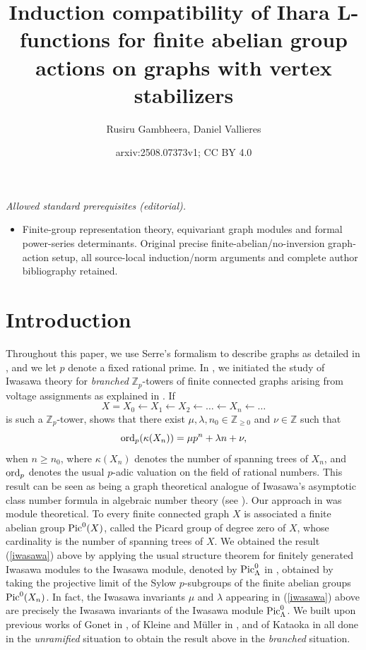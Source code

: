 \documentclass[11pt]{amsart}
\title{Induction compatibility of Ihara L-functions for finite abelian group actions on graphs with vertex stabilizers}
\author{Rusiru Gambheera, Daniel Vallieres}
\date{arxiv:2508.07373v1; CC BY 4.0}
\numberwithin{equation}{section}
\theoremstyle{remark}
\theoremstyle{definition}
\begin{document}
\maketitle
\noindent\textit{Allowed standard prerequisites (editorial).}\begin{itemize}
\item Finite-group representation theory, equivariant graph modules and formal power-series determinants. Original precise finite-abelian/no-inversion graph-action setup, all source-local induction/norm arguments and complete author bibliography retained.
\end{itemize}\medskip
\section{Introduction} \label{Introduction}
Throughout this paper, we use Serre's formalism to describe graphs as detailed in \cite{Serre:1977}, and we let $p$ denote a fixed rational prime.  In \cite{Gambheera/Vallieres:2024}, we initiated the study of Iwasawa theory for \emph{branched} $\mathbb{Z}_{p}$-towers of finite connected graphs arising from voltage assignments as explained in \cite[\S 4.3]{Gambheera/Vallieres:2024}.  If 
\begin{equation*}
X = X_{0} \leftarrow X_{1} \leftarrow X_{2} \leftarrow \ldots \leftarrow X_{n} \leftarrow \ldots 
\end{equation*}
is such a $\mathbb{Z}_{p}$-tower, \cite[Theorem 5.6]{Gambheera/Vallieres:2024} shows that there exist $\mu,\lambda,n_{0} \in \mathbb{Z}_{\ge 0}$ and $\nu \in \mathbb{Z}$ such that
\begin{equation} \label{iwasawa}
{\rm ord}_{p}(\kappa(X_{n})) = \mu p^{n} + \lambda n + \nu, 
\end{equation}
when $n \ge n_{0}$, where $\kappa(X_{n})$ denotes the number of spanning trees of $X_{n}$, and ${\rm ord}_{p}$ denotes the usual $p$-adic valuation on the field of rational numbers.  This result can be seen as being a graph theoretical analogue of Iwasawa's asymptotic class number formula in algebraic number theory (see \cite{Iwasawa:1959, Iwasawa:1973}).  Our approach in \cite{Gambheera/Vallieres:2024} was module theoretical.  To every finite connected graph $X$ is associated a finite abelian group ${\rm Pic}^{0}(X)$, called the Picard group of degree zero of $X$, whose cardinality is the number of spanning trees of $X$.  We obtained the result (\ref{iwasawa}) above by applying the usual structure theorem for finitely generated Iwasawa modules to the Iwasawa module, denoted by ${\rm Pic}_{\Lambda}^{0}$ in \cite[\S 4.3]{Gambheera/Vallieres:2024}, obtained by taking the projective limit of the Sylow $p$-subgroups of the finite abelian groups ${\rm Pic}^{0}(X_{n})$.  In fact, the Iwasawa invariants $\mu$ and $\lambda$ appearing in (\ref{iwasawa}) above are precisely the Iwasawa invariants of the Iwasawa module ${\rm Pic}_{\Lambda}^{0}$.  We built upon previous works of Gonet in \cite{Gonet:2021a, Gonet:2022}, of Kleine and M\"{u}ller in \cite{Kleine/Muller:2023}, and of Kataoka in \cite{Kataoka:2024} all done in the \emph{unramified} situation to obtain the result above in the \emph{branched} situation.
\end{document}
